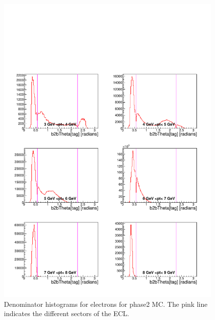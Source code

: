 \documentclass[a4paper,11pt,twosided,final,german,openbib,pdftex,listof=totoc,bibliography=totoc]{scrbook}
\begin{document}
\begin{appendix}
\begin{figure}[!htbp]
	\centering
	\includegraphics[width=\textwidth]{Plots/master/xPMThetaemD_MC}
	\caption[Momentum $\theta$ Electron Denominator Histogram Phase2 MC]{Denominator histograms for electrons for phase2 MC. The pink line indicates the different sectors of the ECL.}
	\label{plt:PMThetaemD_MC}
\end{figure}



\end{appendix}
\end{document}

